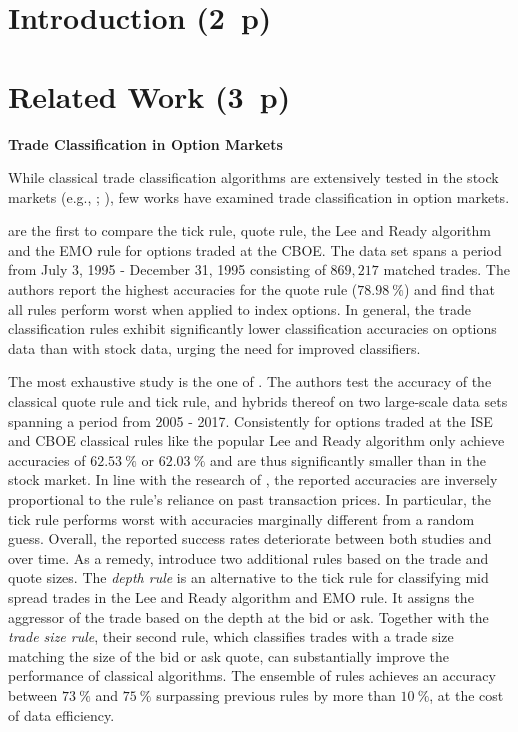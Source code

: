 \section{Introduction (2~p)}\label{sec:introduction}


\section{Related Work (3~p)}\label{sec:related-work}

\textbf{Trade Classification in Option Markets}

While classical trade classification algorithms are extensively tested in the stock markets (e.g., \textcite{chakrabartyTradeClassificationAlgorithms2012}; \textcite{odders-whiteOccurrenceConsequencesInaccurate2000}), few works have examined trade classification in option markets.

\textcite[\pno~882f.]{savickasInferringDirectionOption2003} are the first to compare the tick rule, quote rule, the Lee and Ready algorithm and the EMO rule for options traded at the CBOE. The data set spans a period from July 3, 1995 - December 31, 1995 consisting of $869{,}217$ matched trades. The authors report the highest accuracies for the quote rule ($78.98~\%$) and find that all rules perform worst when applied to index options. In general, the trade classification rules exhibit significantly lower classification accuracies on options data than with stock data, urging the need for improved classifiers.

The most exhaustive study is the one of \textcite[\pno~1f.]{grauerOptionTradeClassification2022}.  The authors test the accuracy of the classical quote rule and tick rule, and hybrids thereof on two large-scale data sets spanning a period from 2005 - 2017. Consistently for options traded at the ISE and CBOE classical rules like the popular Lee and Ready algorithm only achieve accuracies of $62.53~\%$ or $62.03~\%$ and are thus significantly smaller than in the stock market. In line with the research of  \textcite[\pno~886]{savickasInferringDirectionOption2003}, the reported accuracies are inversely proportional to the rule's reliance on past transaction prices. In particular, the tick rule performs worst with accuracies marginally different from a random guess. Overall, the reported success rates deteriorate between both studies and over time. As a remedy, \textcite[\pno~14f.]{grauerOptionTradeClassification2022} introduce two additional rules based on the trade and quote sizes. The \textit{depth rule} is an alternative to the tick rule for classifying mid spread trades in the Lee and Ready algorithm and EMO rule. It assigns the aggressor of the trade based on the depth at the bid or ask. Together with the \textit{trade size rule}, their second rule, which classifies trades with a trade size matching the size of the bid or ask quote, can substantially improve the performance of classical algorithms. The ensemble of rules achieves an accuracy between $73~\%$ and $75~\%$ surpassing previous rules by more than $10~\%$, at the cost of data efficiency.

